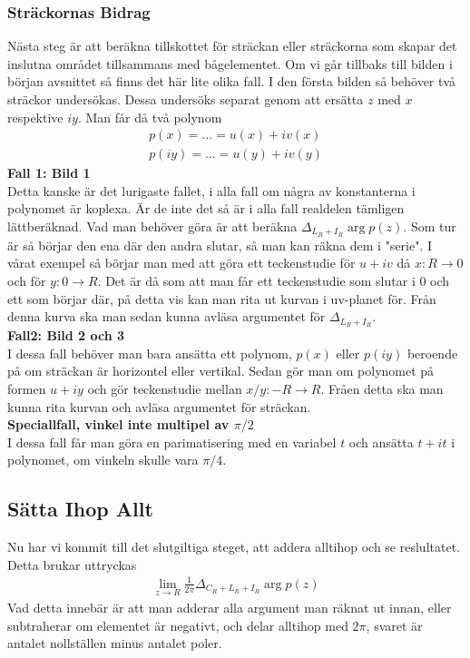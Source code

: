 \subsubsection*{Sträckornas Bidrag}
Nästa steg är att beräkna tillskottet för sträckan eller sträckorna som skapar det inslutna området tillsammans med bågelementet. Om vi går tillbaks till bilden i början avsnittet så finns det här lite olika fall. I den första bilden så behöver två sträckor undersökas. Dessa undersöks separat genom att ersätta $z$ med $x$ respektive $iy$. Man får då två polynom
\begin{align*}
	p(x) = ... = u(x) + iv(x) \\
	p(iy) = ... = u(y) + iv(y)
\end{align*}
\textbf{Fall 1: Bild 1} \\
Detta kanske är det lurigaste fallet, i alla fall om några av konstanterna i polynomet är koplexa. Är de inte det så är i alla fall realdelen tämligen lättberäknad. Vad man behöver göra är att beräkna $\Delta_{L_R + I_R} \arg p(z)$. Som tur är så börjar den ena där den andra slutar, så man kan räkna dem i "serie". I vårat exempel så börjar man med att göra ett teckenstudie för $u+iv$ då $x: R \rightarrow 0$ och för $y:0 \rightarrow R$. Det är då som att man får ett teckenstudie som slutar i 0 och ett som börjar där, på detta vis kan man rita ut kurvan i uv-planet för. Från denna kurva ska man sedan kunna avläsa argumentet för $\Delta_{L_R + I_R}$. \\

\textbf{Fall2: Bild 2 och 3} \\
I dessa fall behöver man bara ansätta ett polynom, $p(x)$ eller $p(iy)$ beroende på om sträckan är horizontel eller vertikal. Sedan gör man om polynomet på formen $u+iy$ och gör teckenstudie mellan $x/y: -R \rightarrow R$. Fråen detta ska man kunna rita kurvan och avläsa argumentet för sträckan. \\

\textbf{Speciallfall, vinkel inte multipel av $\pi/2$} \\
I dessa fall får man göra en parimatisering med en variabel $t$ och ansätta $t+it$ i polynomet, om vinkeln skulle vara $\pi/4$. \\

\subsection*{Sätta Ihop Allt}
Nu har vi kommit till det slutgiltiga steget, att addera alltihop och se reslultatet. Detta brukar uttryckas
\begin{align*}
	\lim_{z \rightarrow R} \frac{1}{2 \pi} \Delta_{C_R + L_R + I_R} \arg p(z)
\end{align*}
Vad detta innebär är att man adderar alla argument man räknat ut innan, eller subtraherar om elementet är negativt, och delar alltihop med $2 \pi$, svaret är antalet nollställen minus antalet poler. \\


